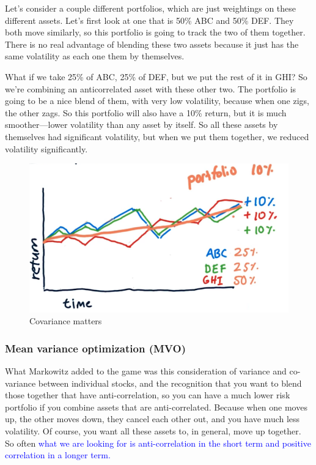 \documentclass[12pt]{article}
\begin{document}
Let's consider a couple different portfolios, which are just weightings on these different assets. Let's first look at one that is 50\% ABC and 50\% DEF. They both move similarly, so this portfolio is going to track the two of them together. There is no real advantage of blending these two assets because it just has the same volatility as each one them by themselves. 

What if we take 25\% of ABC, 25\% of DEF, but we put the rest of it in GHI? So we're combining an anticorrelated asset with these other two. The portfolio is going to be a nice blend of them, with very low volatility, because when one zigs, the other zags. So this portfolio will also have a 10\% return, but it is much smoother---lower volatility than any asset by itself. So all these assets by themselves had significant volatility, but when we put them together, we reduced volatility significantly. 

\begin{figure}[!ht]
\centering
\includegraphics[scale=0.4]{fig/fig68}
\caption{Covariance matters}
\end{figure}

\subsubsection{Mean variance optimization (MVO)}

What Markowitz added to the game was this consideration of variance and co-variance between individual stocks, and the recognition that you want to blend those together that have anti-correlation, so you can have a much lower risk portfolio if you combine assets that are anti-correlated. Because when one moves up, the other moves down, they cancel each other out, and you have much less volatility. Of course, you want all these assets to, in general, move up together. So often \textcolor{blue}{what we are looking for is anti-correlation in the short term and positive correlation in a longer term.}
\end{document}
